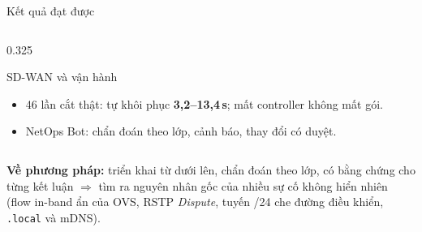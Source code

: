 \documentclass[aspectratio=169, 10pt, xcolor={table}]{beamer}
\begin{document}
\begin{frame}{Kết quả đạt được}
\begin{columns}[T]
\begin{column}{0.325\textwidth}
\begin{card}[okGreen]{SD-WAN và vận hành}
\begin{itemize}
                    \item 46 lần cắt thật: tự khôi phục \textbf{3,2--13,4\,s}; mất controller không mất gói.
                    \item NetOps Bot: chẩn đoán theo lớp, cảnh báo, thay đổi có duyệt.
                \end{itemize}
            \end{card}
        \end{column}
    \end{columns}
    \begin{softcard}[okSoft]\scriptsize
        \textbf{\color{okGreen}Về phương pháp:} triển khai từ dưới lên, chẩn đoán theo lớp, có bằng chứng cho từng kết luận
        $\Rightarrow$ tìm ra nguyên nhân gốc của nhiều sự cố không hiển nhiên (flow in-band ẩn của OVS, RSTP \textit{Dispute}, tuyến /24 che đường điều khiển, \texttt{.local} và mDNS).
    \end{softcard}
\end{frame}
\end{document}
